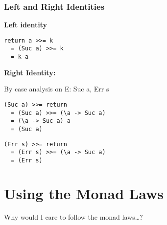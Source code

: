 \documentclass{beamer}
\begin{document}
\begin{frame}[fragile]
\frametitle{Left and Right Identities}
\textbf{Left identity}
\begin{lstlisting}
return a >>= k 
  = (Suc a) >>= k 
  = k a
\end{lstlisting}


\textbf{Right Identity:}\pause

By case analysis on E: Suc a, Err s
\begin{lstlisting}
(Suc a) >>= return 
  = (Suc a) >>= (\a -> Suc a)
  = (\a -> Suc a) a
  = (Suc a)
\end{lstlisting}\pause
\begin{lstlisting}
(Err s) >>= return
  = (Err s) >>= (\a -> Suc a)
  = (Err s)
\end{lstlisting}
\end{frame}



\section{Using the Monad Laws}
\begin{frame}
Why would I care to follow the monad laws\ldots ?
\end{frame}
\end{document}
